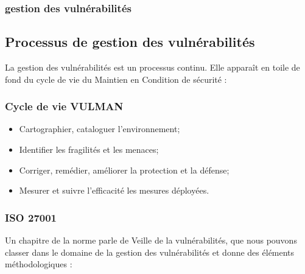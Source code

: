 \begin{frame}
\frametitle<presentation>{gestion des vulnérabilités}
\end{frame}


\subsection{Processus de gestion des vulnérabilités}

La gestion des vulnérabilités est un processus continu. Elle apparaît en toile de fond du cycle de vie du Maintien en Condition de sécurité :

\begin{frame}
\frametitle<presentation>{Cycle de vie VULMAN}
\begin{itemize}
	\item Cartographier, cataloguer l'environnement; 
	\item Identifier les fragilités et les menaces;
	\item Corriger, remédier, améliorer la protection et la défense;
	\item Mesurer et suivre l'efficacité les mesures déployées.
\end{itemize}
\end{frame}


\subsubsection{ISO 27001}

Un chapitre de la norme parle de Veille de la vulnérabilités, que nous pouvons classer dans le domaine de la gestion des vulnérabilités et donne des éléments méthodologiques : 

